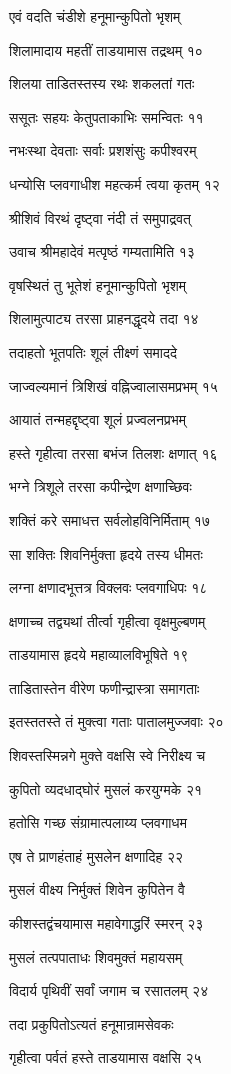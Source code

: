 एवं वदति चंडीशे हनूमान्कुपितो भृशम्

शिलामादाय महतीं ताडयामास तद्रथम् १०

शिलया ताडितस्तस्य रथः शकलतां गतः

ससूतः सहयः केतुपताकाभिः समन्वितः ११

नभःस्था देवताः सर्वाः प्रशशंसुः कपीश्वरम्

धन्योसि प्लवगाधीश महत्कर्म त्वया कृतम् १२

श्रीशिवं विरथं दृष्ट्वा नंदी तं समुपाद्रवत्

उवाच श्रीमहादेवं मत्पृष्ठं गम्यतामिति १३

वृषस्थितं तु भूतेशं हनूमान्कुपितो भृशम्

शिलामुत्पाट्य तरसा प्राहनद्धृदये तदा १४

तदाहतो भूतपतिः शूलं तीक्ष्णं समाददे

जाज्वल्यमानं त्रिशिखं वह्निज्वालासमप्रभम् १५

आयातं तन्महद्दृष्ट्वा शूलं प्रज्वलनप्रभम्

हस्ते गृहीत्वा तरसा बभंज तिलशः क्षणात् १६

भग्ने त्रिशूले तरसा कपीन्द्रेण क्षणाच्छिवः

शक्तिं करे समाधत्त सर्वलोहविनिर्मिताम् १७

सा शक्तिः शिवनिर्मुक्ता हृदये तस्य धीमतः

लग्ना क्षणादभूत्तत्र विक्लवः प्लवगाधिपः १८

क्षणाच्च तद्व्यथां तीर्त्वा गृहीत्वा वृक्षमुल्बणम्

ताडयामास हृदये महाव्यालविभूषिते १९

ताडितास्तेन वीरेण फणीन्द्रास्त्रा समागताः

इतस्ततस्ते तं मुक्त्वा गताः पातालमुज्जवाः २०

शिवस्तस्मिन्नगे मुक्ते वक्षसि स्वे निरीक्ष्य च

कुपितो व्यदधाद्घोरं मुसलं करयुग्मके २१

हतोसि गच्छ संग्रामात्पलाय्य प्लवगाधम

एष ते प्राणहंताहं मुसलेन क्षणादिह २२

मुसलं वीक्ष्य निर्मुक्तं शिवेन कुपितेन वै

कीशस्तद्वंचयामास महावेगाद्धरिं स्मरन् २३

मुसलं तत्पपाताधः शिवमुक्तं महायसम्

विदार्य पृथिवीं सर्वां जगाम च रसातलम् २४

तदा प्रकुपितोऽत्यतं हनूमान्रामसेवकः

गृहीत्वा पर्वतं हस्ते ताडयामास वक्षसि २५


